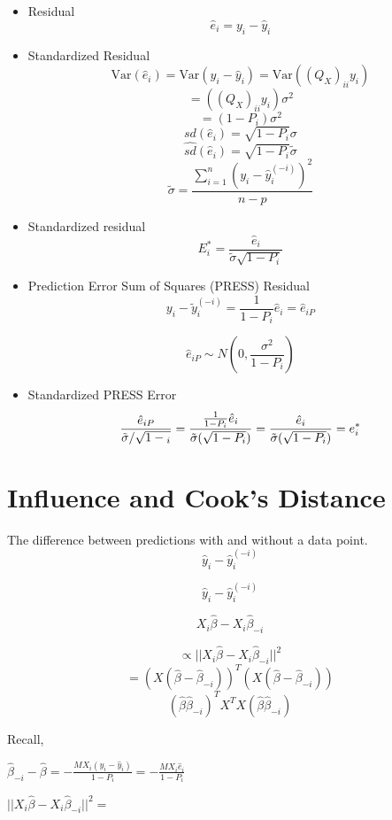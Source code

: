 \documentclass[11pt,fleqn]{book} %
\begin{document}
\begin{itemize}
	\item Residual
		$$\hat{e}_i = y_i - \hat{y}_i $$
	\item Standardized Residual
		$$\text{Var}(\hat{e}_i) = \text{Var}(y_i - \hat{y}_i) = \text{Var}((Q_X)_{ii}y_i)$$
		$$= ((Q_X)_{ii}y_i) \sigma^2 $$
		$$= (1 - P_i)\sigma^2 $$
		$$ sd(\hat{e}_i) = \sqrt{1-P_i} \sigma $$
		$$\hat{sd}(\hat{e}_i) = \sqrt{1-P_i} \tilde{\sigma} $$
		$$ \tilde{\sigma} = \frac{\displaystyle \sum^n_{i=1} (y_i - \hat{y}_i^{(-i)})^2}{n-p}$$
	\item Standardized residual
		$$E^*_i = \frac{\hat{e}_i}{\tilde{\sigma} \sqrt{1 - P_i}} $$
	\item Prediction Error Sum of Squares (PRESS) Residual
		$$y_i - \tilde{y}_i^{(-i)} = \frac{1}{1-P_i} \hat{e}_i = \hat{e}_{iP} $$

		$$ \hat{e}_{iP} \sim N(0, \frac{\sigma^2}{1 - P_i})$$
	\item Standardized PRESS Error
		$$\frac{\hat{e}_{iP}}{\tilde{\sigma}/ \sqrt{1-{_i}}} = \frac{\frac{1}{1-P_i}\hat{e}_i}{\tilde{\sigma}\\(\sqrt{1 - P_i})} = \frac{\hat{e}_i}{\tilde{\sigma}\\(\sqrt{1 - P_i})} = e^*_i$$
\end{itemize}

\section{Influence and Cook's Distance}
\begin{definition}[Influence] The difference between predictions with and without a data point.
	$$\hat{y}_i - \hat{y}_i^{(-i)} $$

\end{definition}

$$\hat{y}_i - \hat{y}_i^{(-i)} $$

$$X_i\hat{\beta} - X_i\hat{\beta}_{-i} $$

	$$\propto || X_i\hat{\beta} - X_i\hat{\beta}_{-i} ||^2	$$
	$$= (X(\hat{\beta} - \hat{\beta}_{-i}))^T (X(\hat{\beta} - \hat{\beta}_{-i})) $$
	$$(\hat{\beta} \hat{\beta}_{-i})^T X^TX (\hat{\beta} \hat{\beta}_{-i}) $$


Recall, 

$\hat{\beta}_{-i} - \hat{\beta} = -\frac{MX_i (y_i - \hat{y}_i)}{1 - P_i} = - \frac{MX_i \hat{e}_i}{1 - P_i}$

$|| X_i\hat{\beta} - X_i\hat{\beta}_{-i} ||^2 = \frac{}{} $
\end{document}
